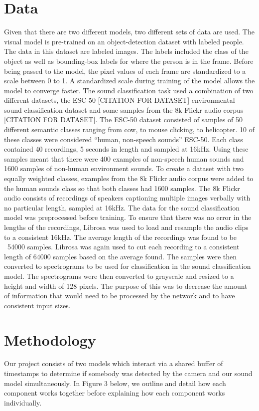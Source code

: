 \documentclass{article}
\begin{document}
\section{Data}
Given that there are two different models, two different sets of data are used. The visual model is pre-trained on an object-detection dataset with labeled people. The data in this dataset are labeled images. The labels included the class of the object as well as bounding-box labels for where the person is in the frame. Before being passed to the model, the pixel values of each frame are standardized to a scale between 0 to 1. A standardized scale during training of the model allows the model to converge faster.
The sound classification task used a combination of two different datasets, the ESC-50 [CITATION FOR DATASET] environmental sound classification dataset and some samples from the 8k Flickr audio corpus [CITATION FOR DATASET]. The ESC-50 dataset consisted of samples of 50 different semantic classes ranging from cow, to mouse clicking, to helicopter. 10 of these classes were considered “human, non-speech sounds” {ESC-50}. Each class contained 40 recordings, 5 seconds in length and sampled at 16kHz. Using these samples meant that there were 400 examples of non-speech human sounds and 1600 samples of non-human environment sounds. To create a dataset with two equally weighted classes, examples from the 8k Flickr audio corpus were added to the human sounds class so that both classes had 1600 samples. The 8k Flickr audio consists of recordings of speakers captioning multiple images verbally with no particular length, sampled at 16kHz. The data for the sound classification model was preprocessed before training. To ensure that there was no error in the lengths of the recordings, Librosa was used to load and resample the audio clips to a consistent 16kHz. The average length of the recordings was found to be ~54000 samples. Librosa was again used to cut each recording to a consistent length of 64000 samples based on the average found. The samples were then converted to spectrograms to be used for classification in the sound classification model. The spectrograms were then converted to grayscale and resized to a height and width of 128 pixels. The purpose of this was to decrease the amount of information that would need to be processed by the network and to have consistent input sizes.

\section{Methodology}
Our project consists of two models which interact via a shared buffer of timestamps to determine if somebody was detected by the camera and our sound model simultaneously. In Figure 3 below, we outline and detail how each component works together before explaining how each component works individually.
\end{document}

